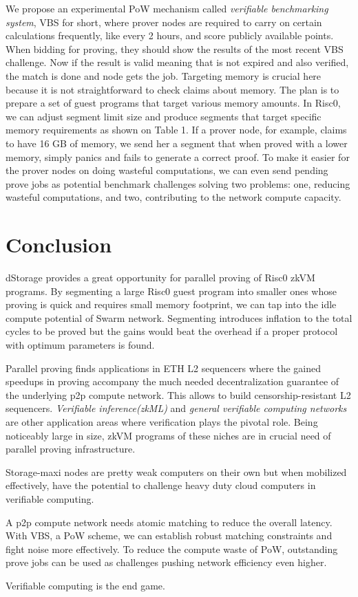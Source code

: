 \documentclass[a4paper, 10pt]{article}
\begin{document}
We propose an experimental PoW mechanism called \textit{verifiable benchmarking system}, VBS for short, where prover nodes are required to carry on certain calculations frequently, like every 2 hours, and score publicly available points. When bidding for proving, they should show the results of the most recent VBS challenge. Now if the result is valid meaning that is not expired and also verified, the match is done and node gets the job. Targeting memory is crucial here because it is not straightforward to check claims about memory. The plan is to prepare a set of guest programs that target various memory amounts. In Risc0, we can adjust segment limit size and produce segments that target specific memory requirements as shown on Table 1. If a prover node, for example, claims to have 16 GB of memory, we send her a segment that when proved with a lower memory, simply panics and fails to generate a correct proof. To make it easier for the prover nodes on doing wasteful computations, we can even send pending prove jobs as potential benchmark challenges solving two problems: one, reducing wasteful computations, and two, contributing to the network compute capacity.

\section*{Conclusion}
dStorage provides a great opportunity for parallel proving of Risc0 zkVM programs. By segmenting a large Risc0 guest program into smaller ones whose proving is quick and requires small memory footprint, we can tap into the idle compute potential of Swarm network. Segmenting introduces inflation to the total cycles to be proved but the gains would beat the overhead if a proper protocol with optimum parameters is found.
\par
Parallel proving finds applications in ETH L2 sequencers where the gained speedups in proving accompany the much needed decentralization guarantee of the underlying p2p compute network. This allows to build censorship-resistant L2 sequencers. \textit{Verifiable inference(zkML)} and \textit{general verifiable computing networks} are other application areas where verification plays the pivotal role. Being noticeably large in size, zkVM programs of these niches are in crucial need of parallel proving infrastructure.
\par
Storage-maxi nodes are pretty weak computers on their own but when mobilized effectively, have the potential to challenge heavy duty cloud computers in verifiable computing. 
\par
A p2p compute network needs atomic matching to reduce the overall latency. With VBS, a PoW scheme, we can establish robust matching constraints and fight noise more effectively. To reduce the compute waste of PoW, outstanding prove jobs can be used as challenges pushing network efficiency even higher.
\par
\begin{flushright}
Verifiable computing is the end game. 
\end{flushright}

\newpage
 

  
\end{document}

